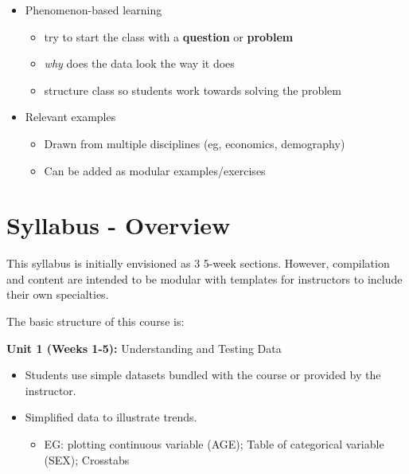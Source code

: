 \documentclass[
]{book}
\providecommand{\tightlist}{%
  \setlength{\itemsep}{0pt}\setlength{\parskip}{0pt}}
\begin{document}
\begin{itemize}
\tightlist
\item
  Phenomenon-based learning

  \begin{itemize}
  \tightlist
  \item
    try to start the class with a \textbf{question} or \textbf{problem}
  \item
    \emph{why} does the data look the way it does
  \item
    structure class so students work towards solving the problem
  \end{itemize}
\item
  Relevant examples

  \begin{itemize}
  \tightlist
  \item
    Drawn from multiple disciplines (eg, economics, demography)
  \item
    Can be added as modular examples/exercises
  \end{itemize}
\end{itemize}

\hypertarget{syllabus---overview}{%
\chapter*{Syllabus - Overview}\label{syllabus---overview}}

This syllabus is initially envisioned as 3 5-week sections. However, compilation and content are intended to be modular with templates for instructors to include their own specialties.

The basic structure of this course is:

\textbf{Unit 1 (Weeks 1-5):} Understanding and Testing Data

\begin{itemize}
\tightlist
\item
  Students use simple datasets bundled with the course or provided by the instructor.
\item
  Simplified data to illustrate trends.

  \begin{itemize}
  \tightlist
  \item
    EG: plotting continuous variable (AGE); Table of categorical variable (SEX); Crosstabs
  \end{itemize}
\end{itemize}
\end{document}
